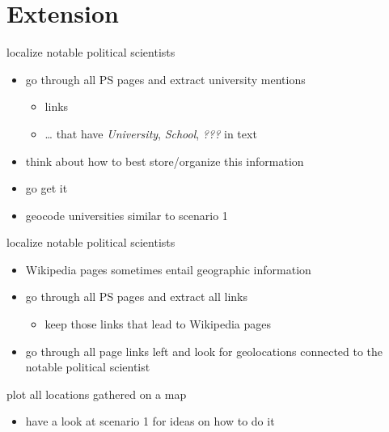 \documentclass[ignorenonframetext,]{beamer}
\providecommand{\tightlist}{%
  \setlength{\itemsep}{0pt}\setlength{\parskip}{0pt}}
\begin{document}
\section{Extension}\label{extension}

\begin{frame}{localize notable political scientists}

\begin{itemize}
\tightlist
\item
  go through all PS pages and extract university mentions

  \begin{itemize}
  \tightlist
  \item
    links
  \item
    \ldots{} that have \emph{University}, \emph{School}, \emph{???} in
    text
  \end{itemize}
\item
  think about how to best store/organize this information
\item
  go get it
\item
  geocode universities similar to scenario 1
\end{itemize}

\end{frame}

\begin{frame}{localize notable political scientists}

\begin{itemize}
\tightlist
\item
  Wikipedia pages sometimes entail geographic information
\item
  go through all PS pages and extract all links

  \begin{itemize}
  \tightlist
  \item
    keep those links that lead to Wikipedia pages
  \end{itemize}
\item
  go through all page links left and look for geolocations connected to
  the notable political scientist
\end{itemize}

\end{frame}

\begin{frame}{plot all locations gathered on a map}

\begin{itemize}
\tightlist
\item
  have a look at scenario 1 for ideas on how to do it
\end{itemize}

\end{frame}
\end{document}
